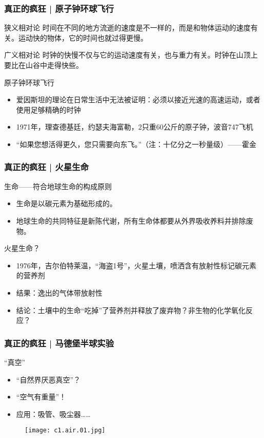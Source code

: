 \begin{frame}
  \frametitle{真正的疯狂 | 原子钟环球飞行}
  \begin{block}{狭义相对论}
    时间在不同的地方流逝的速度是不一样的，而是和物体运动的速度有关。运动快的物体，它的时间也就过得更慢。
  \end{block}
  \pause
  \begin{block}{广义相对论}
    时钟的快慢不仅与它的运动速度有关，也与重力有关。时钟在山顶上要比在山谷中走得快些。
  \end{block}
  \pause
  \begin{block}{原子钟环球飞行}
    \begin{itemize}
      \item 爱因斯坦的理论在日常生活中无法被证明：必须以接近光速的高速运动，或者使用足够精确的时钟
      \item 1971年，理查德\textbullet 基廷，约瑟夫\textbullet 海富勒，2只重60公斤的原子钟，波音747飞机
      \item “如果您想活得更久，您只需要向东飞。”（注：十亿分之一秒量级）——霍金
    \end{itemize}
  \end{block}
\end{frame}

\begin{frame}
  \frametitle{真正的疯狂 | 火星生命}
  \begin{block}{生命——符合地球生命的构成原则}
    \begin{itemize}
      \item 生命是以碳元素为基础形成的。
      \item 地球生命的共同特征是新陈代谢，所有生命体都要从外界吸收养料并排除废物。
    \end{itemize}
  \end{block}
  \pause
  \begin{block}{火星生命？}
    \begin{itemize}
      \item 1976年，吉尔伯特\textbullet 莱温，“海盗1号”，火星土壤，喷洒含有放射性标记碳元素的营养剂
      \item 结果：逸出的气体带放射性
      \item 结论：土壤中的生命“吃掉”了营养剂并释放了废弃物？非生物的化学氧化反应？
    \end{itemize}
  \end{block}
\end{frame}

\begin{frame}
  \frametitle{真正的疯狂 | 马德堡半球实验}
  \begin{block}{“真空”}
    \begin{itemize}
      \item “自然界厌恶真空”？
      \item “空气有重量”！
      \item 应用：吸管、吸尘器……
    \end{itemize}
  \begin{figure}
    \centering
    \texttt{[image: c1.air.01.jpg]}
  \end{figure}
  \end{block}
\end{frame}

